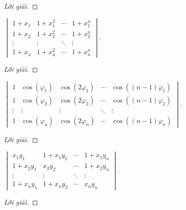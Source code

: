 \documentclass[class=linearalgebra,crop=false]{standalone}
\begin{document}
\begin{proof}[Lời giải]
\end{proof}

\begin{exercise}
    $\begin{vmatrix}
            1 + x_{1} & 1 + x_{1}^{2} & \cdots & 1 + x_{1}^{n} \\
            1 + x_{2} & 1 + x_{2}^{2} & \cdots & 1 + x_{2}^{n} \\
            \vdots    & \vdots        & \ddots & \vdots        \\
            1 + x_{n} & 1 + x_{n}^{2} & \cdots & 1 + x_{n}^{n}
        \end{vmatrix}$.
\end{exercise}

\begin{proof}[Lời giải]
\end{proof}

\begin{exercise}
    $\begin{vmatrix}
            1      & \cos(\varphi_{1}) & \cos(2\varphi_{1}) & \cdots & \cos((n-1)\varphi_{1}) \\
            1      & \cos(\varphi_{2}) & \cos(2\varphi_{2}) & \cdots & \cos((n-1)\varphi_{2}) \\
            \vdots & \vdots            & \vdots             & \ddots & \vdots                 \\
            1      & \cos(\varphi_{n}) & \cos(2\varphi_{n}) & \cdots & \cos((n-1)\varphi_{n})
        \end{vmatrix}$.
\end{exercise}

\begin{proof}[Lời giải]
\end{proof}

\begin{exercise}
    $\begin{vmatrix}
            x_{1}y_{1}     & 1 + x_{1}y_{2} & \cdots & 1 + x_{1}y_{n} \\
            1 + x_{2}y_{1} & x_{2}y_{2}     & \cdots & 1 + x_{2}y_{n} \\
            \vdots         & \vdots         & \ddots & \vdots         \\
            1 + x_{n}y_{1} & 1 + x_{n}y_{2} & \cdots & x_{n}y_{n}
        \end{vmatrix}$.
\end{exercise}

\begin{proof}[Lời giải]
\end{proof}
\end{document}
